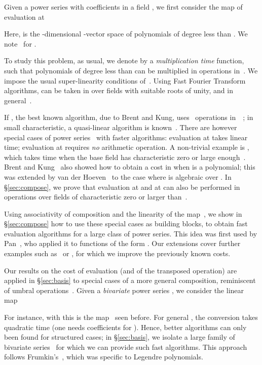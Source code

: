 \documentclass{sig-alternate}
\begin{document}
\smallskip{} Given a power series  with
coefficients in a field , we first consider the map of
evaluation at 

Here,  is the -dimensional -vector space of
polynomials of degree less than . We note~ for 
.

To study this problem, as usual, we denote by  a
\emph{multiplication time} function, such that polynomials of degree
less than  can be multiplied in  operations in~. We
impose the usual super-linearity conditions
of~\cite[Chap.~8]{GaGe99}. Using Fast Fourier Transform algorithms,
 can be taken in  over fields with suitable roots
of unity, and  in
general~\cite{ScSt71,CaKa91}.

If , the best known algorithm, due to Brent and Kung,
uses~ operations in~~\cite{BrKu78}; in
small characteristic, a quasi-linear algorithm is
known~\cite{Bernstein98b}. There are however special cases of power
series~ with faster algorithms: evaluation at  takes
linear time; evaluation at  requires \emph{no} arithmetic
operation. A non-trivial example is , which takes time
 when the base field has characteristic zero or large
enough~\cite{AhStUl75}. Brent and Kung~\cite{BrKu78} also showed how
to obtain a cost in  when  is a polynomial; this
was extended by van der Hoeven~\cite{Hoeven02} to the case where 
is algebraic over . In \S\ref{sec:compose}, we prove that
evaluation at  and at  can also be performed
in  operations over fields of characteristic zero or
larger than~.

Using associativity of composition and the linearity of the
map~, we show in \S\ref{sec:compose} how to use these
special cases as building blocks, to obtain fast evaluation algorithms
for a large class of power series.  This idea was first used by
Pan~\cite{Pan98}, who applied it to functions of the form
. Our extensions cover further examples
such as~ or , for which we improve 
the previously known costs.

\smallskip{}  Our results on the cost
of evaluation (and of the transposed operation) are applied in
\S\ref{sec:basis} to special cases of a more general composition,
reminiscent of umbral operations~\cite{Roman05}. Given a
\emph{bivariate} power series , we
consider the linear map

For instance, with 
this is the map~ seen before.  For general , the
conversion takes quadratic time (one needs  coefficients for
). Hence, better algorithms can only been found for structured
cases; in \S\ref{sec:basis}, we isolate a large family of bivariate
series~ for which we can provide such fast algorithms.
This approach follows Frumkin's~\cite{Frumkin95}, which was specific
to Legendre polynomials.
\end{document}
